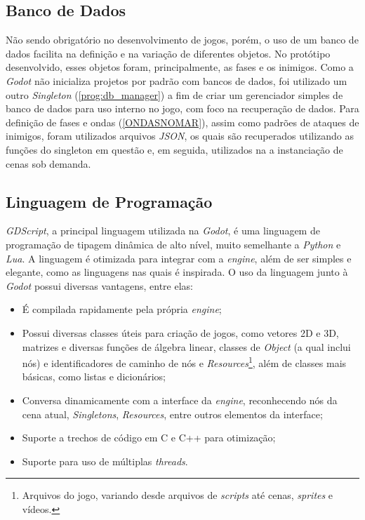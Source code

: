 \subsection{Banco de Dados}

Não sendo obrigatório no desenvolvimento de jogos, porém, o uso de um banco de dados facilita na definição e na variação de diferentes objetos. No protótipo desenvolvido, esses objetos foram, principalmente, as fases e os inimigos. Como a \textit{Godot} não inicializa projetos por padrão com bancos de dados, foi utilizado um outro \textit{Singleton} (\ref{prog:db_manager}) a fim de criar um gerenciador simples de banco de dados para uso interno no jogo, com foco na recuperação de dados. Para definição de fases e ondas (\ref{ONDASNOMAR}), assim como padrões de ataques de inimigos, foram utilizados arquivos \textit{JSON}, os quais são recuperados utilizando as funções do singleton em questão e, em seguida, utilizados na a instanciação de cenas sob demanda.

%     

\subsection{Linguagem de Programação}

\textit{GDScript}, a principal linguagem utilizada na \textit{Godot}, é uma linguagem de programação de tipagem dinâmica de alto nível, muito semelhante a \textit{Python} e \textit{Lua}. A linguagem é otimizada para integrar com a \textit{engine}, além de ser simples e elegante, como as linguagens nas quais é inspirada. O uso da linguagem junto à \textit{Godot} possui diversas vantagens, entre elas:

\begin{itemize}
    \item É compilada rapidamente pela própria \textit{engine};
    \item Possui diversas classes úteis para criação de jogos, como vetores 2D e 3D, matrizes e diversas funções de álgebra linear, classes de \textit{Object} (a qual inclui nós) e identificadores de caminho de nós e \textit{Resources}\footnote{
        Arquivos do jogo, variando desde arquivos de \textit{scripts} até cenas, \textit{sprites} e vídeos.
    }, além de classes mais básicas, como listas e dicionários;
    \item Conversa dinamicamente com a interface da \textit{engine}, reconhecendo nós da cena atual, \textit{Singletons}, \textit{Resources}, entre outros elementos da interface;
    \item Suporte a trechos de código em C e C++ para otimização;
    \item Suporte para uso de múltiplas \textit{threads}.
\end{itemize}


